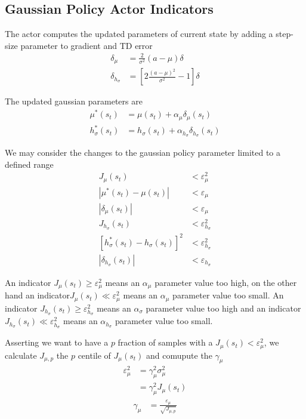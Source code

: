 \documentclass[]{article}
\begin{document}
\subsection{Gaussian Policy Actor Indicators}

The actor computes the updated parameters of current state by adding a step-size parameter to gradient and TD error
\begin{align*}
	\delta_\mu&		= \frac{2}{\sigma^2}(a - \mu) \delta
	\\
	\delta_{h_\sigma}&	= \left[
		2\frac{(a - \mu)^2}{\sigma^2} - 1
	\right] \delta
\end{align*}

The updated gaussian parameters are
\begin{align*}
	\mu^*(s_t)&		= \mu(s_t) + \alpha_\mu \delta_\mu(s_t)
	\\
	h_\sigma^*(s_t)&	= h_\sigma(s_t) + \alpha_{h_\sigma}\delta_{h_\sigma}(s_t)
\end{align*}

We may consider the changes to the gaussian policy parameter limited to a defined range
\begin{align*}
	J_\mu(s_t)&								< \varepsilon^2_\mu
	\\
	|\mu^*(s_t) - \mu(s_t)|&				< \varepsilon_\mu
	\\
	|\delta_\mu(s_t)|&						< \varepsilon_\mu
	\\
	J_{h_\sigma}(s_t)&						< \varepsilon^2_{h_\sigma}
	\\
	[h_\sigma^*(s_t) - h_\sigma(s_t)]^2&	< \varepsilon^2_{h_\sigma}
	\\
	|\delta_{h_\sigma}(s_t)|&				< \varepsilon_{h_\sigma}
\end{align*}

An indicator $ J_\mu(s_t) \ge \varepsilon_\mu^2 $ means an $ \alpha_\mu $ parameter value too high, on the other hand an indicator$ J_\mu(s_t) \ll \varepsilon_\mu^2 $ means an $ \alpha_\mu $ parameter value too small.
An indicator $ J_{h_\sigma}(s_t) \ge \varepsilon_{h_\sigma}^2 $ means an $ \alpha_\sigma $ parameter value too high and an indicator $ J_{h_\sigma}(s_t) \ll \varepsilon_{h_\sigma}^2 $ means an $ \alpha_{h_\sigma} $ parameter value too small.

Asserting we want to have a $ p $ fraction of samples with a $ J_\mu(s_t) < \varepsilon_\mu^2 $, we calculate $ J_{\mu, p} $ the $ p $ centile of $ J_\mu(s_t) $ and comupute the $ \gamma_\mu $
\begin{align*}
	\varepsilon^2_\mu&	= \gamma_\mu^2 \sigma^2_\mu
	\\
	&					= \gamma^2_\mu J_\mu(s_t)
\end{align*}
\begin{align}
	\gamma_\mu&		= \frac{\varepsilon_\mu}{\sqrt{J_{\mu,p}}}
\end{align}
\end{document}
